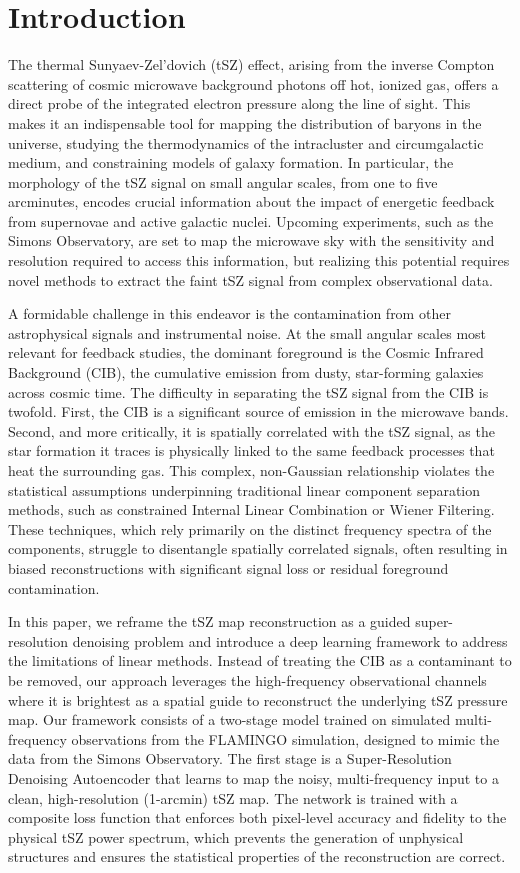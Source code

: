 \documentclass[]{article}
\begin{document}
\section{Introduction}
\label{sec:intro}
The thermal Sunyaev-Zel'dovich (tSZ) effect, arising from the inverse Compton scattering of cosmic microwave background photons off hot, ionized gas, offers a direct probe of the integrated electron pressure along the line of sight. This makes it an indispensable tool for mapping the distribution of baryons in the universe, studying the thermodynamics of the intracluster and circumgalactic medium, and constraining models of galaxy formation. In particular, the morphology of the tSZ signal on small angular scales, from one to five arcminutes, encodes crucial information about the impact of energetic feedback from supernovae and active galactic nuclei. Upcoming experiments, such as the Simons Observatory, are set to map the microwave sky with the sensitivity and resolution required to access this information, but realizing this potential requires novel methods to extract the faint tSZ signal from complex observational data.

A formidable challenge in this endeavor is the contamination from other astrophysical signals and instrumental noise. At the small angular scales most relevant for feedback studies, the dominant foreground is the Cosmic Infrared Background (CIB), the cumulative emission from dusty, star-forming galaxies across cosmic time. The difficulty in separating the tSZ signal from the CIB is twofold. First, the CIB is a significant source of emission in the microwave bands. Second, and more critically, it is spatially correlated with the tSZ signal, as the star formation it traces is physically linked to the same feedback processes that heat the surrounding gas. This complex, non-Gaussian relationship violates the statistical assumptions underpinning traditional linear component separation methods, such as constrained Internal Linear Combination or Wiener Filtering. These techniques, which rely primarily on the distinct frequency spectra of the components, struggle to disentangle spatially correlated signals, often resulting in biased reconstructions with significant signal loss or residual foreground contamination.

In this paper, we reframe the tSZ map reconstruction as a guided super-resolution denoising problem and introduce a deep learning framework to address the limitations of linear methods. Instead of treating the CIB as a contaminant to be removed, our approach leverages the high-frequency observational channels where it is brightest as a spatial guide to reconstruct the underlying tSZ pressure map. Our framework consists of a two-stage model trained on simulated multi-frequency observations from the FLAMINGO simulation, designed to mimic the data from the Simons Observatory. The first stage is a Super-Resolution Denoising Autoencoder that learns to map the noisy, multi-frequency input to a clean, high-resolution (1-arcmin) tSZ map. The network is trained with a composite loss function that enforces both pixel-level accuracy and fidelity to the physical tSZ power spectrum, which prevents the generation of unphysical structures and ensures the statistical properties of the reconstruction are correct.
\end{document}
